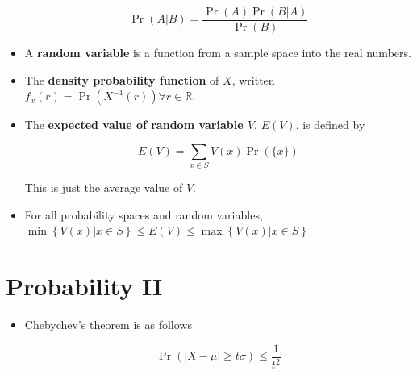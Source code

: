 \documentclass[12pt]{scrartcl}
\begin{document}
\begin{itemize}
        \begin{equation*}
            \Pr(A|B) = \frac{\Pr(A) \Pr(B | A)}{\Pr(B)}
        \end{equation*}

    \item A \textbf{random variable} is a function from a sample space into the real numbers.
    \item The \textbf{density probability function} of $X$, written $f_x (r) = \Pr(X^{-1}(r)) \forall r \in \mathbb{R}$.
    \item The \textbf{expected value of random variable $V$}, $E(V)$, is defined by

        \begin{equation*}
            E(V) = \sum _{x \in S} V(x) \Pr(\{ x \})
        \end{equation*}

        This is just the average value of $V$.

    \item For all probability spaces and random variables, $\min \left\{ V(x) | x \in S \right\} \leq E(V) \leq \max \left\{ V(x) | x \in S \right\}$
\end{itemize}


\section{Probability II}
\begin{itemize}
    \item Chebychev's theorem is as follows

        \begin{equation*}
            \Pr(|X - \mu| \geq t\sigma) \leq \frac{1}{t^2}
        \end{equation*}

\end{itemize}
\end{document}
